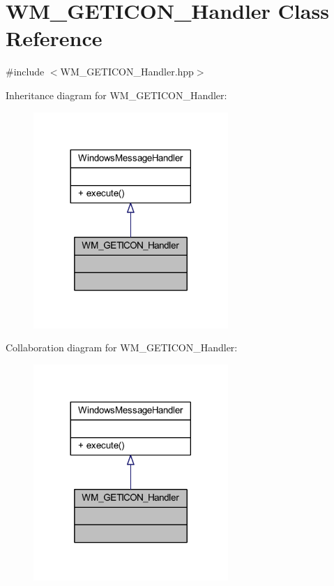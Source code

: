 \hypertarget{class_w_m___g_e_t_i_c_o_n___handler}{}\section{W\+M\+\_\+\+G\+E\+T\+I\+C\+O\+N\+\_\+\+Handler Class Reference}
\label{class_w_m___g_e_t_i_c_o_n___handler}


{\ttfamily \#include $<$W\+M\+\_\+\+G\+E\+T\+I\+C\+O\+N\+\_\+\+Handler.\+hpp$>$}



Inheritance diagram for W\+M\+\_\+\+G\+E\+T\+I\+C\+O\+N\+\_\+\+Handler\+:\nopagebreak
\begin{figure}[H]
\begin{center}
\leavevmode
\includegraphics[width=209pt]{class_w_m___g_e_t_i_c_o_n___handler__inherit__graph}
\end{center}
\end{figure}


Collaboration diagram for W\+M\+\_\+\+G\+E\+T\+I\+C\+O\+N\+\_\+\+Handler\+:\nopagebreak
\begin{figure}[H]
\begin{center}
\leavevmode
\includegraphics[width=209pt]{class_w_m___g_e_t_i_c_o_n___handler__coll__graph}
\end{center}
\end{figure}
